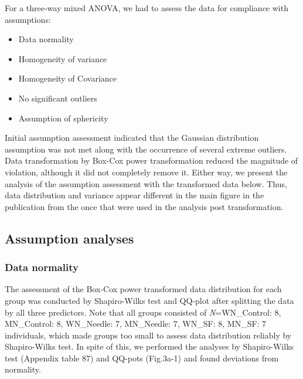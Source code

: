 \documentclass[
  12pt,
  letterpaper,
]{article}
\providecommand{\tightlist}{%
  \setlength{\itemsep}{0pt}\setlength{\parskip}{0pt}}
\begin{document}
For a three-way mixed ANOVA, we had to assess the data for compliance with assumptions:

\begin{itemize}
\tightlist
\item
  Data normality
\item
  Homogeneity of variance
\item
  Homogeneity of Covariance
\item
  No significant outliers
\item
  Assumption of sphericity
\end{itemize}

Initial assumption assessment indicated that the Gaussian distribution assumption was not met along with the occurrence of several extreme outliers. Data transformation by Box-Cox power transformation reduced the magnitude of violation, although it did not completely remove it. Either way, we present the analysis of the assumption assessment with the transformed data below. Thus, data distribution and variance appear different in the main figure in the publication from the once that were used in the analysis post transformation.

\subsection{Assumption analyses}\label{assumption-analyses-2}

\subsubsection{Data normality}\label{data-normality-2}

The assessment of the Box-Cox power transformed data distribution for each group was conducted by Shapiro-Wilks test and QQ-plot after splitting the data by all three predictors. Note that all groups consisted of \emph{N}=WN\_Control: 8, MN\_Control: 8, WN\_Needle: 7, MN\_Needle: 7, WN\_SF: 8, MN\_SF: 7 individuals, which made groups too small to assess data distribution reliably by Shapiro-Wilks test. In spite of this, we performed the analyses by Shapiro-Wilks test (Appendix table 87) and QQ-pots (Fig.3a-1) and found deviations from normality.
\end{document}
